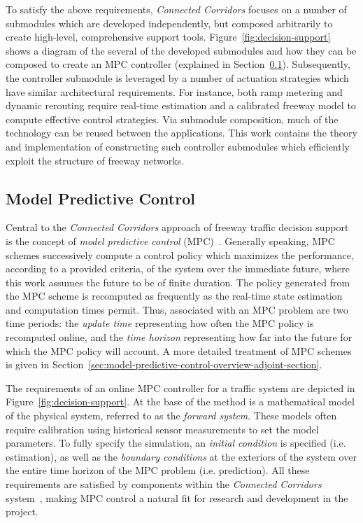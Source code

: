 To satisfy the above requirements, \emph{Connected Corridors} focuses on a number of submodules which are developed independently, but composed arbitrarily to create high-level, comprehensive support tools. Figure~\ref{fig:decision-support} shows a diagram of the several of the developed submodules and how they can be composed to create an MPC controller (explained in Section~\ref{sec:model-predictive-control}). Subsequently, the controller submodule is leveraged by a number of actuation strategies which have similar architectural requirements. For instance, both ramp metering and dynamic rerouting require real-time estimation and a calibrated freeway model to compute effective control strategies. Via submodule composition, much of the technology can be reused between the applications. This work contains the theory and implementation of constructing such controller submodules which efficiently exploit the structure of freeway networks.

\subsection{Model Predictive Control}
\label{sec:model-predictive-control}

Central to the \emph{Connected Corridors} approach of freeway traffic decision support is the concept of \emph{model predictive control} (MPC)~\cite{Muralidharana,o2013splitting,Frejo2011}. Generally speaking, MPC schemes successively compute a control policy which maximizes the performance, according to a provided criteria, of the system over the immediate future, where this work assumes the future to be of finite duration. The policy generated from the MPC scheme is recomputed as frequently as the real-time state estimation and computation times permit. Thus, associated with an MPC problem are two time periods: the \emph{update time} representing how often the MPC policy is recomputed online, and the \emph{time horizon} representing how far into the future for which the MPC policy will account. A more detailed treatment of MPC schemes is given in Section~\ref{sec:model-predictive-control-overview-adjoint-section}.

The requirements of an online MPC controller for a traffic system are depicted in Figure~\ref{fig:decision-support}. At the base of the method is a mathematical model of the physical system, referred to as the \emph{forward system}. These models often require calibration using historical sensor measurements to set the model parameters. To fully specify the simulation, an \emph{initial condition} is specified (i.e. estimation), as well as the \emph{boundary conditions} at the exteriors of the system over the entire time horizon of the MPC problem (i.e. prediction). All these requirements are satisfied by components within the \emph{Connected Corridors} system~\cite{Muralidharan2009b,dervisoglu2014macroscopic,work2010traffic}, making MPC control a natural fit for research and development in the project.

